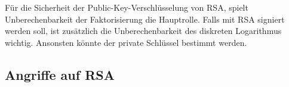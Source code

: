     Für die Sicherheit der Public-Key-Verschlüsselung von RSA, spielt Unberechenbarkeit der Faktorisierung die Hauptrolle. Falls mit RSA signiert werden soll, ist zusätzlich die Unberechenbarkeit des diskreten Logarithmus wichtig. Ansonsten könnte der private Schlüssel bestimmt werden.

    \subsection{Angriffe auf RSA}
